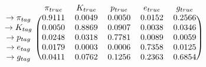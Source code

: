 \documentclass{standalone}
\begin{document}
$\displaystyle
\begin{blockarray}{cccccc}
    & \pi_{true} & K_{true} & p_{true} & e_{true} & g_{true} \\
\begin{block}{c(ccccc)}
    \rightarrow \pi_{tag} &  0.9111 &  0.0049 &  0.0050 &  0.0152 &  0.2566 \\
    \rightarrow K_{tag}   &  0.0050 &  0.8869 &  0.0907 &  0.0038 &  0.0346 \\
    \rightarrow p_{tag}   &  0.0248 &  0.0318 &  0.7781 &  0.0089 &  0.0059 \\
    \rightarrow e_{tag}   &  0.0179 &  0.0003 &  0.0006 &  0.7358 &  0.0125 \\
    \rightarrow g_{tag}   &  0.0411 &  0.0762 &  0.1256 &  0.2363 &  0.6854 \\
\end{block}
\end{blockarray}
$
\end{document}

